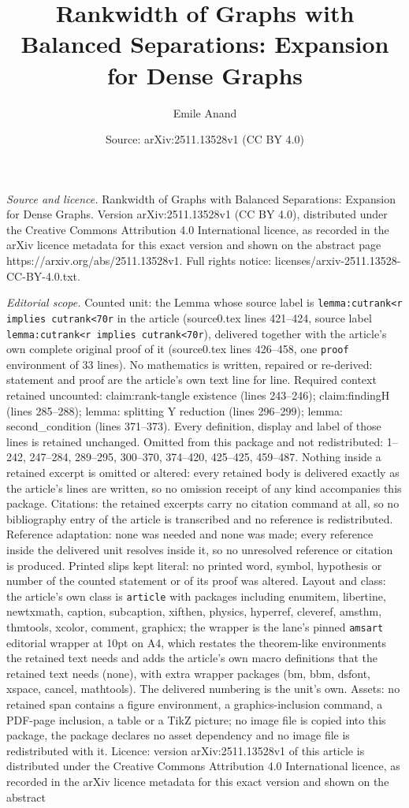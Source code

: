 \documentclass[10pt,a4paper]{amsart}
\title[Rankwidth of Graphs with Balanced Separations: Expansion for]{Rankwidth of Graphs with Balanced Separations: Expansion for Dense Graphs}
\author{Emile Anand}
\date{Source: arXiv:2511.13528v1 (CC BY 4.0)}
\begin{document}
\maketitle

\noindent\emph{Source and licence.} Rankwidth of Graphs with Balanced Separations: Expansion for Dense Graphs. Version arXiv:2511.13528v1 (CC BY 4.0), distributed under the Creative Commons Attribution 4.0 International licence, as recorded in the arXiv licence metadata for this exact version and shown on the abstract page https://arxiv.org/abs/2511.13528v1. Full rights notice: licenses/arxiv-2511.13528-CC-BY-4.0.txt.\par\smallskip

\noindent\textit{Editorial scope.} Counted unit: the Lemma whose source label is \texttt{lemma:cutrank<r implies cutrank<70r} in the article (source0.tex lines 421--424, source label \texttt{lemma:cutrank<r implies cutrank<70r}), delivered together with the article's own complete original proof of it (source0.tex lines 426--458, one \texttt{proof} environment of 33 lines). No mathematics is written, repaired or re-derived: statement and proof are the article's own text line for line. Required context retained uncounted: claim:rank-tangle existence (lines 243--246); claim:findingH (lines 285--288); lemma: splitting Y reduction (lines 296--299); lemma: second\_condition (lines 371--373). Every definition, display and label of those lines is retained unchanged. Omitted from this package and not redistributed: 1--242, 247--284, 289--295, 300--370, 374--420, 425--425, 459--487. Nothing inside a retained excerpt is omitted or altered: every retained body is delivered exactly as the article's lines are written, so no omission receipt of any kind accompanies this package. Citations: the retained excerpts carry no citation command at all, so no bibliography entry of the article is transcribed and no reference is redistributed. Reference adaptation: none was needed and none was made; every reference inside the delivered unit resolves inside it, so no unresolved reference or citation is produced. Printed slips kept literal: no printed word, symbol, hypothesis or number of the counted statement or of its proof was altered. Layout and class: the article's own class is \texttt{article} with packages including enumitem, libertine, newtxmath, caption, subcaption, xifthen, physics, hyperref, cleveref, amsthm, thmtools, xcolor, comment, graphicx; the wrapper is the lane's pinned \texttt{amsart} editorial wrapper at 10pt on A4, which restates the theorem-like environments the retained text needs and adds the article's own macro definitions that the retained text needs (none), with extra wrapper packages (bm, bbm, dsfont, xspace, cancel, mathtools). The delivered numbering is the unit's own. Assets: no retained span contains a figure environment, a graphics-inclusion command, a PDF-page inclusion, a table or a TikZ picture; no image file is copied into this package, the package declares no asset dependency and no image file is redistributed with it. Licence: version arXiv:2511.13528v1 of this article is distributed under the Creative Commons Attribution 4.0 International licence, as recorded in the arXiv licence metadata for this exact version and shown on the abstract 
\end{document}
